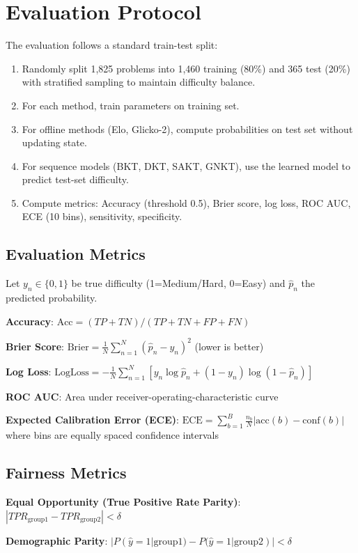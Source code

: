 \documentclass[conference]{IEEEtran}
\begin{document}
\section{Evaluation Protocol}

The evaluation follows a standard train-test split:
\begin{enumerate}
    \item Randomly split 1,825 problems into 1,460 training (80\%) and 365 test (20\%) with stratified sampling to maintain difficulty balance.
    \item For each method, train parameters on training set.
    \item For offline methods (Elo, Glicko-2), compute probabilities on test set without updating state.
    \item For sequence models (BKT, DKT, SAKT, GNKT), use the learned model to predict test-set difficulty.
    \item Compute metrics: Accuracy (threshold 0.5), Brier score, log loss, ROC AUC, ECE (10 bins), sensitivity, specificity.
\end{enumerate}

\subsection{Evaluation Metrics}
Let $y_n \in \{0,1\}$ be true difficulty (1=Medium/Hard, 0=Easy) and $\hat{p}_n$ the predicted probability.

\textbf{Accuracy}: $\text{Acc} = (TP + TN)/(TP + TN + FP + FN)$

\textbf{Brier Score}: $\text{Brier} = \frac{1}{N}\sum_{n=1}^{N}(\hat{p}_n - y_n)^2$ (lower is better)

\textbf{Log Loss}: $\text{LogLoss} = -\frac{1}{N}\sum_{n=1}^{N}[y_n \log \hat{p}_n + (1-y_n)\log(1-\hat{p}_n)]$

\textbf{ROC AUC}: Area under receiver-operating-characteristic curve

\textbf{Expected Calibration Error (ECE)}: $\text{ECE} = \sum_{b=1}^{B}\frac{n_b}{N}|\text{acc}(b) - \text{conf}(b)|$ where bins are equally spaced confidence intervals

\subsection{Fairness Metrics}
\textbf{Equal Opportunity (True Positive Rate Parity)}: $|TPR_{\text{group1}} - TPR_{\text{group2}}| < \delta$

\textbf{Demographic Parity}: $|P(\hat{y}=1|\text{group1}) - P(\hat{y}=1|\text{group2})| < \delta$
\end{document}
